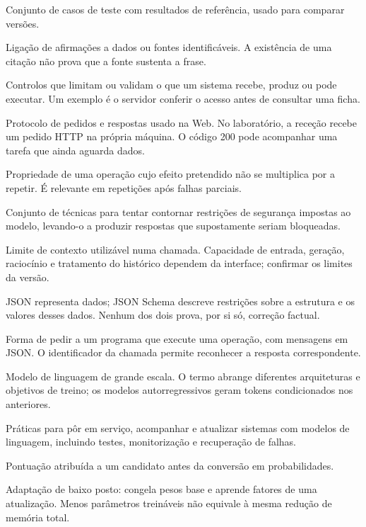 \begin{description}[style=nextline,leftmargin=0pt,labelindent=0pt,labelsep=0pt,labelwidth=0pt]
\item[Golden set] Conjunto de casos de teste com resultados de referência, usado para comparar versões.
\item[Grounding] Ligação de afirmações a dados ou fontes identificáveis. A existência de uma citação não prova que a fonte sustenta a frase.
\item[Guardrails] Controlos que limitam ou validam o que um sistema recebe, produz ou pode executar. Um exemplo é o servidor conferir o acesso antes de consultar uma ficha.
\item[HTTP] Protocolo de pedidos e respostas usado na Web. No laboratório, a receção recebe um pedido HTTP na própria máquina. O código 200 pode acompanhar uma tarefa que ainda aguarda dados.
\item[Idempotência] Propriedade de uma operação cujo efeito pretendido não se multiplica por a repetir. É relevante em repetições após falhas parciais.
\item[Jailbreak] Conjunto de técnicas para tentar contornar restrições de segurança impostas ao modelo, levando-o a produzir respostas que supostamente seriam bloqueadas.
\item[Janela de contexto] Limite de contexto utilizável numa chamada. Capacidade de entrada, geração, raciocínio e tratamento do histórico dependem da interface; confirmar os limites da versão.
\item[JSON e JSON Schema] JSON representa dados; JSON Schema descreve restrições sobre a estrutura e os valores desses dados. Nenhum dos dois prova, por si só, correção factual.
\item[JSON-RPC] Forma de pedir a um programa que execute uma operação, com mensagens em JSON. O identificador da chamada permite reconhecer a resposta correspondente.
\item[LLM (Large Language Model)] Modelo de linguagem de grande escala. O termo abrange diferentes arquiteturas e objetivos de treino; os modelos autorregressivos geram tokens condicionados nos anteriores.
\item[LLMOps] Práticas para pôr em serviço, acompanhar e atualizar sistemas com modelos de linguagem, incluindo testes, monitorização e recuperação de falhas.
\item[Logit] Pontuação atribuída a um candidato antes da conversão em probabilidades.
\item[LoRA] Adaptação de baixo posto: congela pesos base e aprende fatores de uma atualização. Menos parâmetros treináveis não equivale à mesma redução de memória total.

\end{description}
